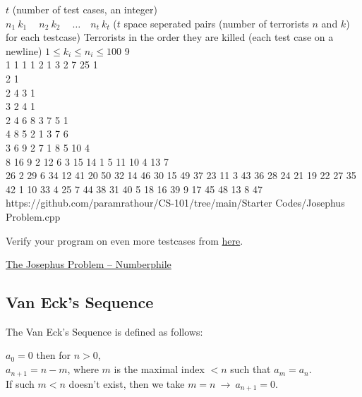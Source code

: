 \begin{testcases}
	{$t$ \hfill(number of test cases, an integer)\\
	$n_1\ k_1\ \quad n_2\ k_2\ \quad \ldots\quad n_t\ k_t$ \hfill($t$ space seperated pairs (number of terrorists $n$ and $k$) for each testcase)}
	{Terrorists in the order they are killed \hfill(each test case on a newline)}
	{$1 \leq k_i \leq n_i \leq 100$}
	{9\\1 1 1 1 2 1 3 2 7 25}
	{1\\2 1\\2 4 3 1\\3 2 4 1\\2 4 6 8 3 7 5 1\\4 8 5 2 1 3 7 6\\3 6 9 2 7 1 8 5 10 4\\8 16 9 2 12 6 3 15 14 1 5 11 10 4 13 7\\26 2 29 6 34 12 41 20 50 32 14 46 30 15 49 37 23 11 3 43 36 28 24 21 19 22 27 35 42 1 10 33 4 25 7 44 38 31 40 5 18 16 39 9 17 45 48 13 8 47}
	{https://github.com/paramrathour/CS-101/tree/main/Starter Codes/Josephus Problem.cpp}
\end{testcases}
\begin{note}
	Verify your program on even more testcases from \href{https://cses.fi/problemset/task/2163/}{here}.
\end{note}
\begin{funvideo}
	\href{https://youtu.be/uCsD3ZGzMgE}{The Josephus Problem -- Numberphile}
\end{funvideo}
\subsection{Van Eck's Sequence}
The Van Eck's Sequence is defined as follows:

$a_0 = 0$ then for $n>0$,\\
$a_{n+1} = n-m$, where $m$ is the maximal index $<n$ such that $a_{m}=a_{n}$.
\\If such $m<n$ doesn't exist, then we take $m=n\ \rightarrow\ a_{n+1}=0$.

